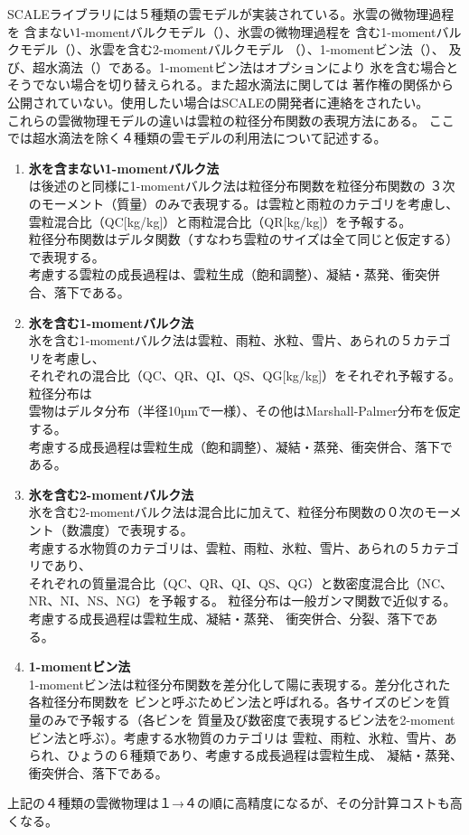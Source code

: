 
SCALEライブラリには５種類の雲モデルが実装されている。氷雲の微物理過程を
含まない1-momentバルクモデル（\cite{kessler_1969}）、氷雲の微物理過程を
含む1-momentバルクモデル（\cite{tomita_2008}）、氷雲を含む2-momentバルクモデル
（\cite{sn_2014}）、1-momentビン法（\cite{suzuki_etal_2010}）、
及び、超水滴法（\cite{Shima_etal_2009}）である。1-momentビン法はオプションにより
氷を含む場合とそうでない場合を切り替えられる。また超水滴法に関しては
著作権の関係から公開されていない。使用したい場合はSCALEの開発者に連絡をされたい。\\
これらの雲微物理モデルの違いは雲粒の粒径分布関数の表現方法にある。
ここでは超水滴法を除く４種類の雲モデルの利用法について記述する。

\begin{enumerate}
\item {\bf 氷を含まない1-momentバルク法\cite{kessler_1969}}\\
\cite{kessler_1969}は後述の\cite{tomita_2008}と同様に1-momentバルク法は粒径分布関数を粒径分布関数の
３次のモーメント（質量）のみで表現する。\cite{kessler_1969}は雲粒と雨粒のカテゴリを考慮し、
雲粒混合比（QC[kg/kg]）と雨粒混合比（QR[kg/kg]）を予報する。\\
粒径分布関数はデルタ関数（すなわち雲粒のサイズは全て同じと仮定する）で表現する。\\
考慮する雲粒の成長過程は、雲粒生成（飽和調整）、凝結・蒸発、衝突併合、落下である。
\item {\bf 氷を含む1-momentバルク法\cite{tomita_2008}}\\
氷を含む1-momentバルク法は雲粒、雨粒、氷粒、雪片、あられの５カテゴリを考慮し、\\
それぞれの混合比（QC、QR、QI、QS、QG[kg/kg]）をそれぞれ予報する。粒径分布は\\
雲物はデルタ分布（半径10µmで一様）、その他はMarshall-Palmer分布を仮定する。\\
考慮する成長過程は雲粒生成（飽和調整）、凝結・蒸発、衝突併合、落下である。
\item {\bf 氷を含む2-momentバルク法\cite{sn_2014}}\\
氷を含む2-momentバルク法は混合比に加えて、粒径分布関数の０次のモーメント（数濃度）で表現する。\\
考慮する水物質のカテゴリは、雲粒、雨粒、氷粒、雪片、あられの５カテゴリであり、\\
それぞれの質量混合比（QC、QR、QI、QS、QG）と数密度混合比（NC、NR、NI、NS、NG）を予報する。
粒径分布は一般ガンマ関数で近似する。考慮する成長過程は雲粒生成、凝結・蒸発、
衝突併合、分裂、落下である。
\item {\bf 1-momentビン法\cite{suzuki_etal_2010}}\\
1-momentビン法は粒径分布関数を差分化して陽に表現する。差分化された各粒径分布関数を
ビンと呼ぶためビン法と呼ばれる。各サイズのビンを質量のみで予報する（各ビンを
質量及び数密度で表現するビン法を2-momentビン法と呼ぶ）。考慮する水物質のカテゴリは
雲粒、雨粒、氷粒、雪片、あられ、ひょうの６種類であり、考慮する成長過程は雲粒生成、
凝結・蒸発、衝突併合、落下である。
\end{enumerate}

上記の４種類の雲微物理は１→４の順に高精度になるが、その分計算コストも高くなる。


